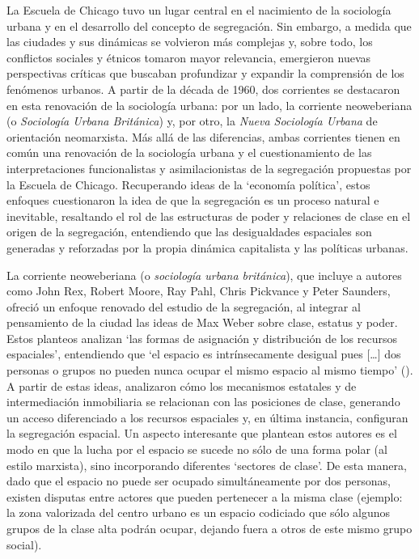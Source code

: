 \documentclass[
  spanish,
  a4paper,%
  chapterprefix=true,%
  DIV=calc,%
  twoside]{scrbook}%
\begin{document}
La Escuela de Chicago tuvo un lugar central en el nacimiento de la
sociología urbana y en el desarrollo del concepto de segregación. Sin
embargo, a medida que las ciudades y sus dinámicas se volvieron más
complejas y, sobre todo, los conflictos sociales y étnicos tomaron mayor
relevancia, emergieron nuevas perspectivas críticas que buscaban
profundizar y expandir la comprensión de los fenómenos urbanos. A partir
de la década de 1960, dos corrientes se destacaron en esta renovación de
la sociología urbana: por un lado, la corriente neoweberiana (o
\emph{Sociología Urbana Británica}) y, por otro, la \emph{Nueva Sociología Urbana}
de orientación neomarxista. Más allá de las diferencias, ambas
corrientes tienen en común una renovación de la sociología urbana y el
cuestionamiento de las interpretaciones funcionalistas y
asimilacionistas de la segregación propuestas por la Escuela de Chicago.
Recuperando ideas de la `economía política', estos enfoques cuestionaron
la idea de que la segregación es un proceso natural e inevitable,
resaltando el rol de las estructuras de poder y relaciones de clase en
el origen de la segregación, entendiendo que las desigualdades
espaciales son generadas y reforzadas por la propia dinámica capitalista
y las políticas
urbanas.

La corriente neoweberiana (o \emph{sociología urbana británica}), que incluye
a autores como John Rex, Robert Moore, Ray Pahl, Chris Pickvance y Peter
Saunders, ofreció un enfoque renovado del estudio de la segregación, al
integrar al pensamiento de la ciudad las ideas de Max Weber sobre clase,
estatus y poder. Estos planteos analizan `las formas de asignación y
distribución de los recursos espaciales', entendiendo que `el espacio es
intrínsecamente desigual pues {[}\ldots{]} dos personas o grupos no pueden
nunca ocupar el mismo espacio al mismo tiempo' (). A partir de estas ideas, analizaron cómo los mecanismos estatales
y de intermediación inmobiliaria se relacionan con las posiciones de
clase, generando un acceso diferenciado a los recursos espaciales y, en
última instancia, configuran la segregación espacial. Un aspecto
interesante que plantean estos autores es el modo en que la lucha por el
espacio se sucede no sólo de una forma polar (al estilo marxista), sino
incorporando diferentes `sectores de clase'. De esta manera, dado que el
espacio no puede ser ocupado simultáneamente por dos personas, existen
disputas entre actores que pueden pertenecer a la misma clase (ejemplo:
la zona valorizada del centro urbano es un espacio codiciado que sólo
algunos grupos de la clase alta podrán ocupar, dejando fuera a otros de
este mismo grupo social).
\end{document}
